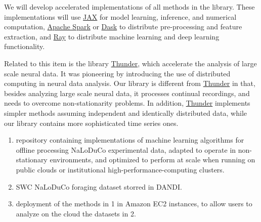

We will develop accelerated implementations of all methods in the library.
These implementations will use \href{https://docs.jax.dev/}{JAX} for model
learning, inference, and numerical computation,
\href{https://spark.apache.org/}{Apache Spark} or
\href{https://www.dask.org/}{Dask} to distribute pre-processing and feature
extraction, and \href{https://docs.ray.io/}{Ray} to distribute machine learning
and deep learning functionality.

Related to this item is the library
\href{https://github.com/thunder-project/thunder}{Thunder}, which accelerate the
analysis of large scale neural data. It was pioneering by introducing the use
of distributed computing in neural data analysis.
%
Our library is different from
\href{https://github.com/thunder-project/thunder}{Thunder} in that, besides
analyzing large scale neural data, it processes continual recordings, and needs
to overcome non-stationarity problems.
%
%
In addition, \href{https://github.com/thunder-project/thunder}{Thunder}
implements simpler methods assuming independent and identically distributed
data, while our library contains more sophisticated time series ones.

\label{sec:deliverablesOfflineAnalysis}

\begin{enumerate}

    \item repository containing implementations of machine learning algorithms
        for offline processing NaLoDuCo experimental data, adapted to operate
        in non-stationary environments, and optimized to perform at scale when
        running on public clouds or institutional
        high-performance-computing clusters.

    \item SWC NaLoDuCo foraging dataset storred in DANDI.

    \item deployment of the methods in 1 in Amazon EC2 instances, to allow
        users to analyze on the cloud the datasets in 2.

\end{enumerate}


